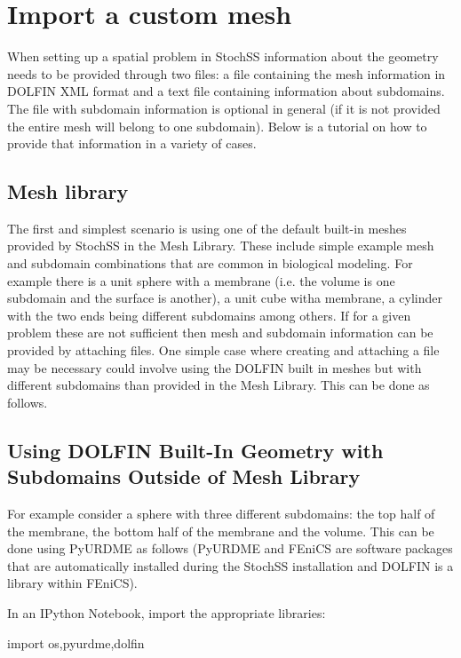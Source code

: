 
\chapter{Import a custom mesh}

When setting up a spatial problem in StochSS information about the geometry needs to be provided through two files: a
file containing the mesh information in DOLFIN XML format and a text file containing information about subdomains. The
file with subdomain information is optional in general (if it is not provided the entire mesh will belong to one subdomain).
Below is a tutorial on how to provide that information in a variety of cases.

\section{Mesh library}

The first and simplest scenario is using one of the default built-in meshes provided by StochSS in the Mesh Library.
These include simple example mesh and subdomain combinations that are common in biological modeling. For example
there is a unit sphere with a membrane (i.e. the volume is one subdomain and the surface is another), a unit cube witha
membrane, a cylinder with the two ends being different subdomains among others. If for a given problem these are not
sufficient then mesh and subdomain information can be provided by attaching files. One simple case where creating and
attaching a file may be necessary could involve using the DOLFIN built in meshes but with different subdomains than
provided in the Mesh Library. This can be done as follows.

\section{Using DOLFIN Built-In Geometry with Subdomains Outside of Mesh Library}

For example consider a sphere with three different subdomains: the top half of the membrane, the bottom half of the
membrane and the volume. This can be done using PyURDME as follows (PyURDME and FEniCS are software packages
that are automatically installed during the StochSS installation and DOLFIN is a library within FEniCS).

In an IPython Notebook, import the appropriate libraries:

\begin{ipythonnb}
import os,pyurdme,dolfin
\end{ipythonnb}

